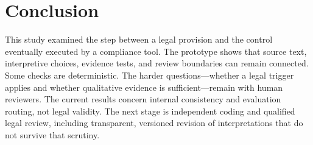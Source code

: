 \documentclass{IOS-Book-Article}
\begin{document}
\section{Conclusion}

This study examined the step between a legal provision and the control eventually executed by a compliance tool. The prototype shows that source text, interpretive choices, evidence tests, and review boundaries can remain connected. Some checks are deterministic. The harder questions---whether a legal trigger applies and whether qualitative evidence is sufficient---remain with human reviewers. The current results concern internal consistency and evaluation routing, not legal validity. The next stage is independent coding and qualified legal review, including transparent, versioned revision of interpretations that do not survive that scrutiny.



\end{document}
